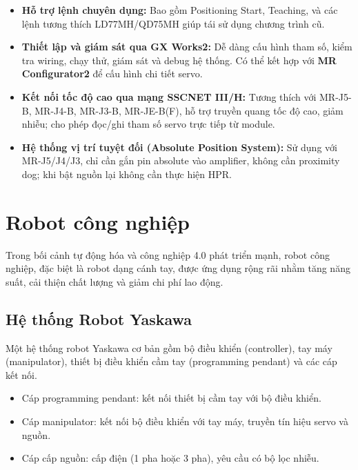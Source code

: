 \begin{itemize}
    \item \textbf{Hỗ trợ lệnh chuyên dụng:}  
    Bao gồm Positioning Start, Teaching, và các lệnh tương thích LD77MH/QD75MH giúp tái sử dụng chương trình cũ.

    \item \textbf{Thiết lập và giám sát qua GX Works2:}  
    Dễ dàng cấu hình tham số, kiểm tra wiring, chạy thử, giám sát và debug hệ thống.  
    Có thể kết hợp với \textbf{MR Configurator2} để cấu hình chi tiết servo.

    \item \textbf{Kết nối tốc độ cao qua mạng SSCNET III/H:}  
    Tương thích với MR-J5-B, MR-J4-B, MR-J3-B, MR-JE-B(F), hỗ trợ truyền quang tốc độ cao, giảm nhiễu;  
    cho phép đọc/ghi tham số servo trực tiếp từ module.

    \item \textbf{Hệ thống vị trí tuyệt đối (Absolute Position System):}  
    Sử dụng với MR-J5/J4/J3, chỉ cần gắn pin absolute vào amplifier, không cần proximity dog;  
    khi bật nguồn lại không cần thực hiện HPR.
\end{itemize}


\section{Robot công nghiệp}

Trong bối cảnh tự động hóa và công nghiệp 4.0 phát triển mạnh, robot công nghiệp, đặc biệt là robot dạng cánh tay, được ứng dụng rộng rãi nhằm tăng năng suất, cải thiện chất lượng và giảm chi phí lao động.

\subsection{Hệ thống Robot Yaskawa}

Một hệ thống robot Yaskawa cơ bản gồm bộ điều khiển (controller), tay máy (manipulator), thiết bị điều khiển cầm tay (programming pendant) và các cáp kết nối.

\begin{itemize}
    \item Cáp programming pendant: kết nối thiết bị cầm tay với bộ điều khiển.
    \item Cáp manipulator: kết nối bộ điều khiển với tay máy, truyền tín hiệu servo và nguồn.
    \item Cáp cấp nguồn: cấp điện (1 pha hoặc 3 pha), yêu cầu có bộ lọc nhiễu.
\end{itemize}

